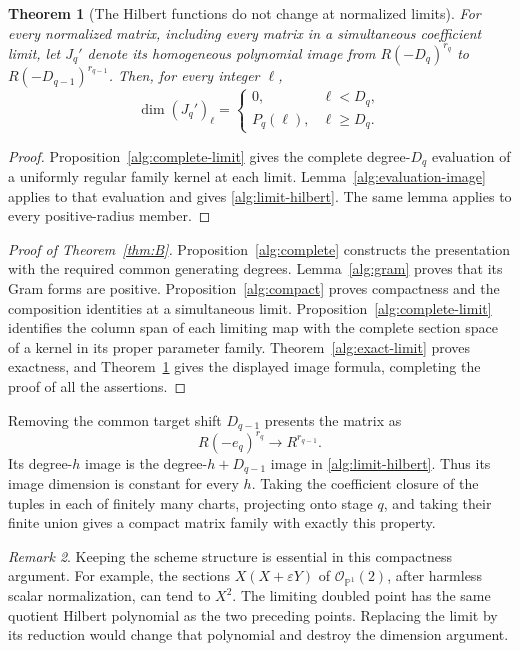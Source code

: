 \documentclass[11pt,reqno]{amsart}
\numberwithin{equation}{section}
\newtheorem{theorem}{Theorem}[section]
\theoremstyle{definition}
\theoremstyle{remark}
\newtheorem{remark}[theorem]{Remark}
\begin{document}
\begin{theorem}[The Hilbert functions do not change at normalized limits]
\label{alg:hilbert}
For every normalized matrix, including every matrix in a simultaneous
coefficient limit, let \(J_q'\) denote its homogeneous polynomial image
from \(R(-D_q)^{r_q}\) to \(R(-D_{q-1})^{r_{q-1}}\). Then, for every
integer \(\ell\),
\begin{equation}
 \dim(J_q')_\ell=
 \begin{cases}
  0,&\ell<D_q,\\
  P_q(\ell),&\ell\geq D_q.
 \end{cases}
 \label{alg:limit-hilbert}
\end{equation}
\end{theorem}

\begin{proof}
Proposition~\ref{alg:complete-limit} gives the complete degree-\(D_q\)
evaluation of a uniformly regular family kernel at each limit.
Lemma~\ref{alg:evaluation-image} applies to that evaluation and
gives \eqref{alg:limit-hilbert}. The same lemma applies to every
positive-radius member.
\end{proof}

\begin{proof}[Proof of Theorem~\ref{thm:B}]
Proposition~\ref{alg:complete} constructs the presentation with the
required common generating degrees. Lemma~\ref{alg:gram} proves that
its Gram forms are positive. Proposition~\ref{alg:compact} proves
compactness and the composition identities at a simultaneous limit.
Proposition~\ref{alg:complete-limit} identifies the column span of each
limiting map with the complete section space of a kernel in its proper
parameter family. Theorem~\ref{alg:exact-limit} proves exactness, and
Theorem~\ref{alg:hilbert} gives the displayed image formula, completing
the proof of all the assertions.
\end{proof}

Removing the common target shift \(D_{q-1}\) presents the matrix as
\[
 R(-e_q)^{r_q}\longrightarrow R^{r_{q-1}}.
\]
Its degree-\(h\) image is the degree-\(h+D_{q-1}\) image in
\eqref{alg:limit-hilbert}. Thus its image dimension is constant for
every \(h\). Taking the coefficient closure of the tuples in each of
finitely many charts, projecting onto stage \(q\), and taking their
finite union gives a compact matrix family with exactly this property.

\begin{remark}
Keeping the scheme structure is essential in this compactness
argument. For example, the sections \(X(X+\varepsilon Y)\) of
\(\mathcal O_{\mathbb P^1}(2)\), after harmless scalar normalization,
can tend to \(X^2\). The limiting doubled point has the same quotient
Hilbert polynomial as the two preceding points. Replacing the limit
by its reduction would change that polynomial and destroy the
dimension argument.
\end{remark}
\end{document}
